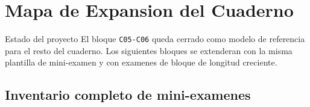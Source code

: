 \chapter{Mapa de Expansion del Cuaderno}

\begin{planningbox}{Estado del proyecto}
El bloque \texttt{C05-C06} queda cerrado como modelo de referencia para el resto del cuaderno.
Los siguientes bloques se extenderan con la misma plantilla de mini-examen y con examenes de
bloque de longitud creciente.
\end{planningbox}

\section{Inventario completo de mini-examenes}


